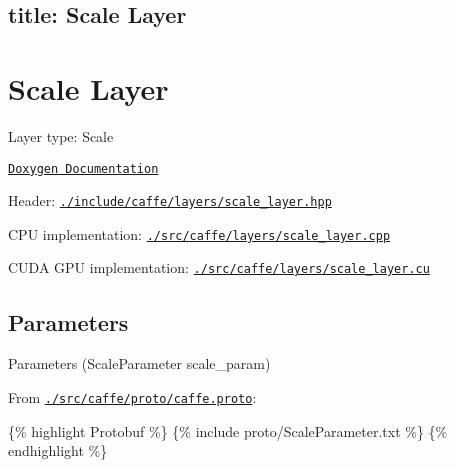 

 \subsection*{title\+: Scale Layer }

\section*{Scale Layer}


\begin{DoxyItemize}
\item Layer type\+: {\ttfamily Scale}
\item \href{http://caffe.berkeleyvision.org/doxygen/classcaffe_1_1ScaleLayer.html}{\tt Doxygen Documentation}
\item Header\+: \href{https://github.com/BVLC/caffe/blob/master/include/caffe/layers/scale_layer.hpp}{\tt {\ttfamily ./include/caffe/layers/scale\+\_\+layer.hpp}}
\item C\+PU implementation\+: \href{https://github.com/BVLC/caffe/blob/master/src/caffe/layers/scale_layer.cpp}{\tt {\ttfamily ./src/caffe/layers/scale\+\_\+layer.cpp}}
\item C\+U\+DA G\+PU implementation\+: \href{https://github.com/BVLC/caffe/blob/master/src/caffe/layers/scale_layer.cu}{\tt {\ttfamily ./src/caffe/layers/scale\+\_\+layer.cu}}
\end{DoxyItemize}

\subsection*{Parameters}


\begin{DoxyItemize}
\item Parameters ({\ttfamily Scale\+Parameter scale\+\_\+param})
\item From \href{https://github.com/BVLC/caffe/blob/master/src/caffe/proto/caffe.proto}{\tt {\ttfamily ./src/caffe/proto/caffe.proto}}\+:
\end{DoxyItemize}

\{\% highlight Protobuf \%\} \{\% include proto/\+Scale\+Parameter.\+txt \%\} \{\% endhighlight \%\} 
